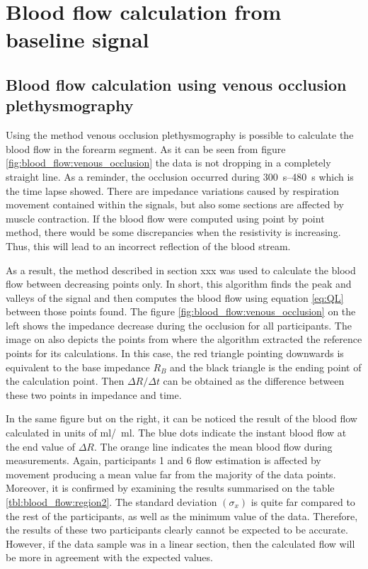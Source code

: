 \pagebreak
\section{Blood flow calculation from baseline signal}
\label{section results 4}

\subsection{Blood flow calculation using venous occlusion plethysmography}
\label{section results 4.1}
Using the method venous occlusion plethysmography is possible to calculate the blood flow in the forearm segment. As it can be seen from figure \ref{fig:blood_flow:venous_occlusion} the data is not dropping in a completely straight line. As a reminder, the occlusion occurred during \SIrange{300}{480}{\second} which is the time lapse showed. There are impedance variations caused by respiration movement contained within the signals, but also some sections are affected by muscle contraction. If the blood flow were computed using point by point method, there would be some discrepancies when the resistivity is increasing. Thus, this will lead to an incorrect reflection of the blood stream. 

As a result, the method described in section xxx was used to calculate the blood flow between decreasing points only. In short, this algorithm finds the peak and valleys of the signal and then computes the blood flow using equation \ref{eq:QL} between those points found. The figure \ref{fig:blood_flow:venous_occlusion} on the left shows the impedance decrease during the occlusion for all participants. The image on also depicts the points from where the algorithm extracted the reference points for its calculations. In this case, the red triangle pointing downwards is equivalent to the base impedance $R_B$ and the black triangle is the ending point of the calculation point. Then $\Delta R / \Delta t$ can be obtained as the difference between these two points in impedance and time. 

In the same figure but on the right, it can be noticed the result of the blood flow calculated in units of \si{\ml /  \ml}. The blue dots indicate the instant blood flow at the end value of $\Delta R$. The orange line indicates the mean blood flow during measurements. Again, participants 1 and 6 flow estimation is affected by movement producing a mean value far from the majority of the data points. Moreover, it is confirmed by examining the results summarised on the table \ref{tbl:blood_flow:region2}. The standard deviation $(\sigma_x)$ is quite far compared to the rest of the participants, as well as the minimum value of the data. Therefore, the results of these two participants clearly cannot be expected to be accurate. However, if the data sample was in a linear section, then the calculated flow will be more in agreement with the expected values. 

